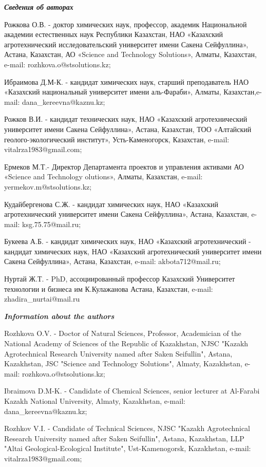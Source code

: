 \emph{\textbf{Сведения об авторах}}

Рожкова О.В. - доктор химических наук, профессор, академик Национальной
академии естественных наук Республики Казахстан, НАО «Казахский
агротехнический исследовательский университет имени Сакена Сейфуллина»,
Астана, Казахстан, АО «Science and Technology Solutions», Алматы,
Казахстан, e-mail: rozhkova.o@stsolutions.kz;

Ибраимова Д.М-К. - кандидат химических наук, старший преподаватель НАО
«Казахский национальный университет имени аль-Фараби», Алматы,
Казахстан,e-mail: dana\_kereevna@kaznu.kz;

Рожков В.И. - кандидат технических наук, НАО «Казахский агротехнический
университет имени Сакена Сейфуллина», Астана, Казахстан, ТОО «Алтайский
геолого-экологический институт», Усть-Каменогорск, Казахстан, e-mail:
vitalrza1983@gmail.com;

Ермеков М.Т.- Директор Департамента проектов и управления активами АО
«Science and Technology olutions», Алматы, Казахстан, e-mail:
yermekov.m@stsolutions.kz;

Кудайбергенова С.Ж. - кандидат химических наук, НАО «Казахский
агротехнический университет имени Сакена Сейфуллина», Астана, Казахстан,
e-mail: ksg.75.75@mail.ru;

Букеева А.Б. - кандидат химических наук, НАО «Казахский агротехнический
- кандидат химических наук, НАО «Казахский агротехнический университет
имени Сакена Сейфуллина», Астана, Казахстан, e-mail: akbota712@mail.ru;

Нуртай Ж.Т. - PhD, ассоциированный профессор Казахский Университет
технологии и бизнеса им К.Кулажанова Астана, Казахстан, e-mail:
zhadira\_nurtai@mail.ru

\emph{\textbf{Information about the authors}}

Rozhkova O.V. - Doctor of Natural Sciences, Professor, Academician of
the National Academy of Sciences of the Republic of Kazakhstan, NJSC
"Kazakh Agrotechnical Research University named after Saken Seifullin",
Astana, Kazakhstan, JSC "Science and Technology Solutions", Almaty,
Kazakhstan, e-mail: rozhkova.o@stsolutions.kz;

Ibraimova D.M-K. - Candidate of Chemical Sciences, senior lecturer at
Al-Farabi Kazakh National University, Almaty, Kazakhstan, e-mail:
dana\_kereevna@kaznu.kz;

Rozhkov V.I. - Candidate of Technical Sciences, NJSC "Kazakh
Agrotechnical Research University named after Saken Seifullin", Astana,
Kazakhstan, LLP "Altai Geological-Ecological Institute",
Ust-Kamenogorsk, Kazakhstan, e-mail: vitalrza1983@gmail.com;

